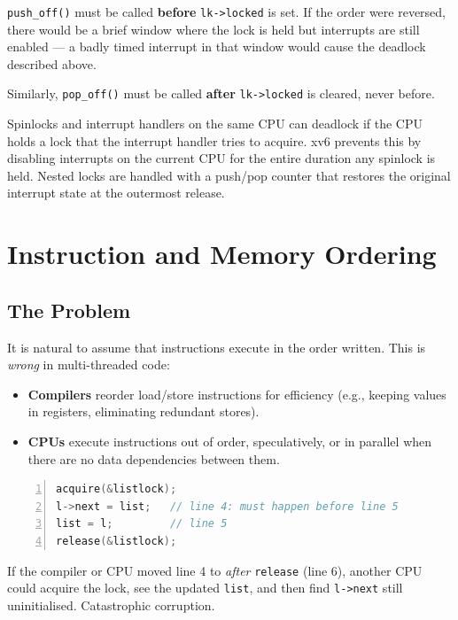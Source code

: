 \documentclass[11pt, a4paper]{article}
\begin{document}
\begin{tcolorbox}[warning, title={Critical Ordering Constraint}]
\lstinline|push_off()| must be called \textbf{before} \lstinline|lk->locked| is set. If the order were reversed, there would be a brief window where the lock is held but interrupts are still enabled --- a badly timed interrupt in that window would cause the deadlock described above.

Similarly, \lstinline|pop_off()| must be called \textbf{after} \lstinline|lk->locked| is cleared, never before.
\end{tcolorbox}

\begin{tcolorbox}[summary, title={Section Summary}]
Spinlocks and interrupt handlers on the same CPU can deadlock if the CPU holds a lock that the interrupt handler tries to acquire. xv6 prevents this by disabling interrupts on the current CPU for the entire duration any spinlock is held. Nested locks are handled with a push/pop counter that restores the original interrupt state at the outermost release.
\end{tcolorbox}

\section{Instruction and Memory Ordering}
\label{sec:memorder}

\subsection{The Problem}

It is natural to assume that instructions execute in the order written. This is \emph{wrong} in multi-threaded code:

\begin{itemize}[leftmargin=1.5em]
  \item \textbf{Compilers} reorder load/store instructions for efficiency (e.g., keeping values in registers, eliminating redundant stores).
  \item \textbf{CPUs} execute instructions out of order, speculatively, or in parallel when there are no data dependencies between them.
\end{itemize}

\begin{tcolorbox}[race, title={A Dangerous Reordering Example}]
\begin{lstlisting}[language=C, numbers=left]
acquire(&listlock);
l->next = list;   // line 4: must happen before line 5
list = l;         // line 5
release(&listlock);
\end{lstlisting}

If the compiler or CPU moved line 4 to \emph{after} \lstinline|release| (line 6), another CPU could acquire the lock, see the updated \lstinline|list|, and then find \lstinline|l->next| still uninitialised. Catastrophic corruption.
\end{tcolorbox}
\end{document}
